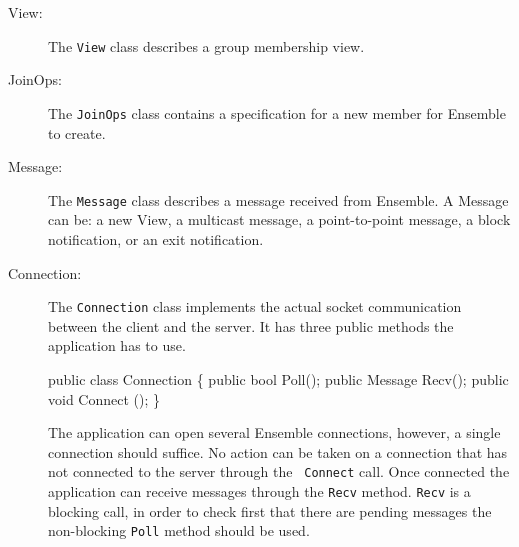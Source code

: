 \begin{description}
\item[View:] The {\tt View} class describes a group membership view. 

\item[JoinOps:] The {\tt JoinOps} class contains a
  specification for a new member for Ensemble to create. 

\item[Message:] The {\tt Message} class describes a message received
  from Ensemble. A Message can be: a new View, a multicast message, a
  point-to-point message, a block notification, or an exit notification. 

\item[Connection:] The {\tt Connection} class implements the actual
  socket communication between the client and the server. It has three
  public methods the application has to use.

  \begin{codebox}
   public class Connection \{
       public bool Poll();	  
       public Message Recv();
       public void Connect ();
  \}
  \end{codebox}

  The application can open several Ensemble connections, however, a
  single connection should suffice. No action can be taken on a
  connection that has not connected to the server through the {\tt
  Connect} call. Once connected the application can receive messages
  through the {\tt Recv} method. {\tt Recv} is a blocking call, in
  order to check first that there are pending messages the
  non-blocking {\tt Poll} method should be used. 
  


\end{description}
